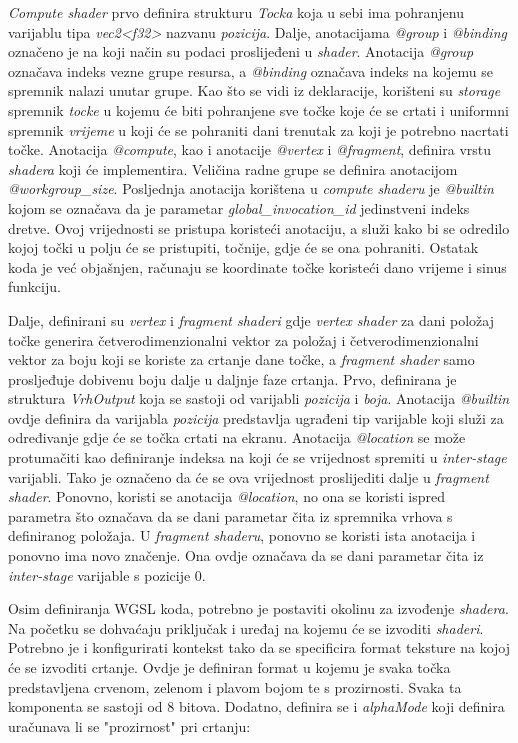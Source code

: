 \documentclass{foi}
\begin{document}
\textit{Compute shader} prvo definira strukturu \textit{Tocka} koja u sebi ima pohranjenu varijablu tipa \textit{vec2<f32>} nazvanu \textit{pozicija}. Dalje, anotacijama \textit{@group} i \textit{@binding} označeno je na koji način su podaci proslijeđeni u \textit{shader}. Anotacija \textit{@group} označava indeks vezne grupe resursa, a \textit{@binding} označava indeks na kojemu se spremnik nalazi unutar grupe. Kao što se vidi iz deklaracije, korišteni su \textit{storage} spremnik \textit{tocke} u kojemu će biti pohranjene sve točke koje će se crtati i uniformni spremnik \textit{vrijeme} u koji će se pohraniti dani trenutak za koji je potrebno nacrtati točke. Anotacija \textit{@compute}, kao i anotacije \textit{@vertex} i \textit{@fragment}, definira vrstu \textit{shadera} koji će implementira. Veličina radne grupe se definira anotacijom \textit{@workgroup\_size}. Posljednja anotacija korištena u \textit{compute shaderu} je \textit{@builtin} kojom se označava da je parametar \textit{global\_invocation\_id} jedinstveni indeks dretve. Ovoj vrijednosti se pristupa koristeći anotaciju, a služi kako bi se odredilo kojoj točki u polju će se pristupiti, točnije, gdje će se ona pohraniti. Ostatak koda je već objašnjen, računaju se koordinate točke koristeći dano vrijeme i sinus funkciju.

Dalje, definirani su \textit{vertex} i \textit{fragment shaderi} gdje \textit{vertex shader} za dani položaj točke generira četverodimenzionalni vektor za položaj i četverodimenzionalni vektor za boju koji se koriste za crtanje dane točke, a \textit{fragment shader} samo prosljeđuje dobivenu boju dalje u daljnje faze crtanja.  Prvo, definirana je struktura \textit{VrhOutput} koja se sastoji od varijabli \textit{pozicija} i \textit{boja}. Anotacija \textit{@builtin} ovdje definira da varijabla \textit{pozicija} predstavlja ugrađeni tip varijable koji služi za određivanje gdje će se točka crtati na ekranu. Anotacija \textit{@location} se može protumačiti kao definiranje indeksa na koji će se vrijednost spremiti u \textit{inter-stage} varijabli. Tako je označeno da će se ova vrijednost proslijediti dalje u \textit{fragment shader}. Ponovno, koristi se anotacija \textit{@location}, no ona se koristi ispred parametra što označava da se dani parametar čita iz spremnika vrhova s definiranog položaja. U \textit{fragment} \textit{shaderu}, ponovno se koristi ista anotacija i ponovno ima novo značenje. Ona ovdje označava da se dani parametar čita iz \textit{inter-stage} varijable s pozicije 0.

Osim definiranja WGSL koda, potrebno je postaviti okolinu za izvođenje \textit{shadera}. Na početku se dohvaćaju priključak i uređaj na kojemu će se izvoditi \textit{shaderi}. Potrebno je i konfigurirati kontekst tako da se specificira format teksture na kojoj će se izvoditi crtanje. Ovdje je definiran format u kojemu je svaka točka predstavljena crvenom, zelenom i plavom bojom te s prozirnosti. Svaka ta komponenta se sastoji od 8 bitova. Dodatno, definira se i \textit{alphaMode} koji definira uračunava li se "prozirnost" pri crtanju:
\end{document}
